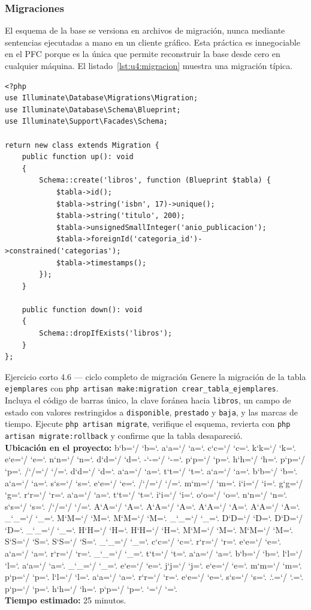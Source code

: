 \documentclass[11pt,a4paper,openany]{book}
\newcommand{\ruta}[1]{{\ttfamily\small\rutaaux #1\relax}}
\def\rutaaux{\futurelet\next\rutapaso}
\def\rutapaso{%
	\ifx\next\relax \let\sig\relax
	\else \let\sig\rutaimprime \fi \sig}
\def\rutaimprime#1{%
	#1\ifnum`#1=`/ \allowbreak\fi
	\ifnum`#1=`. \allowbreak\fi
	\rutaaux}
\begin{document}
\subsubsection{Migraciones}

El esquema de la base se versiona en archivos de migración, nunca mediante sentencias ejecutadas a mano en un cliente gráfico. Esta práctica es innegociable en el PFC porque es la única que permite reconstruir la base desde cero en cualquier máquina. El listado~\ref{lst:u4:migracion} muestra una migración típica.

\begin{lstlisting}[style=php,caption={Migracion que crea la tabla de libros con su clave foranea.},label={lst:u4:migracion}]
<?php
use Illuminate\Database\Migrations\Migration;
use Illuminate\Database\Schema\Blueprint;
use Illuminate\Support\Facades\Schema;

return new class extends Migration {
	public function up(): void
	{
		Schema::create('libros', function (Blueprint $tabla) {
			$tabla->id();
			$tabla->string('isbn', 17)->unique();
			$tabla->string('titulo', 200);
			$tabla->unsignedSmallInteger('anio_publicacion');
			$tabla->foreignId('categoria_id')->constrained('categorias');
			$tabla->timestamps();
		});
	}

	public function down(): void
	{
		Schema::dropIfExists('libros');
	}
};
\end{lstlisting}

\begin{cajaejercicio}{Ejercicio corto 4.6 --- ciclo completo de migración}
	Genere la migración de la tabla \texttt{ejemplares} con \texttt{php artisan make:migration crear\_tabla\_ejemplares}. Incluya el código de barras único, la clave foránea hacia \texttt{libros}, un campo de estado con valores restringidos a \texttt{disponible}, \texttt{prestado} y \texttt{baja}, y las marcas de tiempo. Ejecute \texttt{php artisan migrate}, verifique el esquema, revierta con \texttt{php artisan migrate:rollback} y confirme que la tabla desapareció.\\[3pt]
	\textbf{Ubicación en el proyecto:} \ruta{backend-php/database/migrations/AAAA\_MM\_DD\_HHMMSS\_crear\_tabla\_ejemplares.php}\\[3pt]
	\textbf{Tiempo estimado:} 25 minutos.
\end{cajaejercicio}
\end{document}
